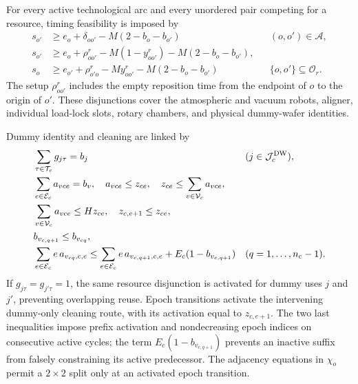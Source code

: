 \documentclass[11pt]{article}
\begin{document}
For every active technological arc and every unordered pair competing for a
resource, timing feasibility is imposed by
\begin{align}
s_{o'}&\ge e_o+\delta_{oo'}-M(2-b_o-b_{o'})
&&(o,o')\in\mathcal A,\\
s_{o'}&\ge e_o+\rho^r_{oo'}-M(1-y^r_{oo'})
-M(2-b_o-b_{o'}),\\
s_o&\ge e_{o'}+\rho^r_{o'o}-My^r_{oo'}
-M(2-b_o-b_{o'})
&&\{o,o'\}\subseteq\mathcal O_r.
\end{align}
The setup $\rho^r_{oo'}$ includes the empty reposition time from the endpoint
of $o$ to the origin of $o'$. These disjunctions cover the atmospheric and
vacuum robots, aligner, individual load-lock slots, rotary chambers, and
physical dummy-wafer identities.

Dummy identity and cleaning are linked by
\begin{align}
&\sum_{\tau\in\mathcal T_c}g_{j\tau}=b_j
&&(j\in\mathcal J_c^{\rm DW}),\\
&\sum_{e\in\mathcal E_c}a_{vce}=b_v,\quad
a_{vce}\le z_{ce},\quad
z_{ce}\le\sum_{v\in\mathcal V_c}a_{vce},\\
&\sum_{v\in\mathcal V_c}a_{vce}\le H z_{ce},\quad
z_{c,e+1}\le z_{ce},\\
&b_{v_{c,q+1}}\le b_{v_{cq}},\\
&\sum_{e\in\mathcal E_c}e\,a_{v_{cq},c,e}
\le\sum_{e\in\mathcal E_c}e\,a_{v_{c,q+1},c,e}
+E_c(1-b_{v_{c,q+1}})
&& (q=1,\ldots,n_c-1).
\end{align}
If $g_{j\tau}=g_{j'\tau}=1$, the same resource disjunction is activated for
dummy uses $j$ and $j'$, preventing overlapping reuse. Epoch transitions
activate the intervening dummy-only cleaning route, with its activation equal
to $z_{c,e+1}$. The two last inequalities impose prefix activation and
nondecreasing epoch indices on consecutive active cycles; the term
$E_c(1-b_{v_{c,q+1}})$ prevents an inactive suffix from falsely constraining
its active predecessor. The adjacency equations in $\chi_o$ permit a
$2\times2$ split only at an activated epoch transition.
\end{document}
